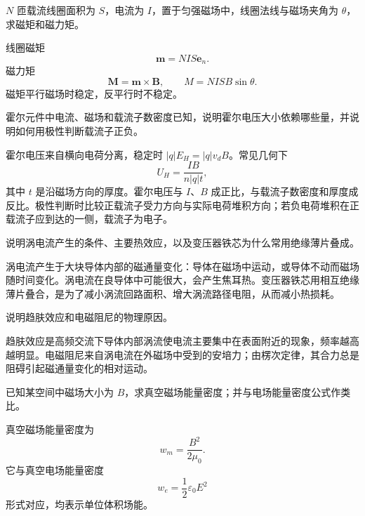 \begin{exercise}[level=standard]
$N$ 匝载流线圈面积为 $S$，电流为 $I$，置于匀强磁场中，线圈法线与磁场夹角为 $\theta$，求磁矩和磁力矩。
\begin{solution}
线圈磁矩
\[
  \bm m=NIS\bm e_n.
\]
磁力矩
\[
  \bm M=\bm m\times\bm B,\qquad M=NISB\sin\theta.
\]
磁矩平行磁场时稳定，反平行时不稳定。
\end{solution}
\end{exercise}

\begin{exercise}[level=standard]
霍尔元件中电流、磁场和载流子数密度已知，说明霍尔电压大小依赖哪些量，并说明如何用极性判断载流子正负。
\begin{solution}
霍尔电压来自横向电荷分离，稳定时 $|q|E_H=|q|v_dB$。常见几何下
\[
  U_H=\frac{IB}{n|q|t},
\]
其中 $t$ 是沿磁场方向的厚度。霍尔电压与 $I$、$B$ 成正比，与载流子数密度和厚度成反比。极性判断时比较正载流子受力方向与实际电荷堆积方向；若负电荷堆积在正载流子应到达的一侧，载流子为电子。
\end{solution}
\end{exercise}

\begin{exercise}[level=basic]
说明涡电流产生的条件、主要热效应，以及变压器铁芯为什么常用绝缘薄片叠成。
\begin{solution}
涡电流产生于大块导体内部的磁通量变化：导体在磁场中运动，或导体不动而磁场随时间变化。涡电流在良导体中可能很大，会产生焦耳热。变压器铁芯用相互绝缘薄片叠合，是为了减小涡流回路面积、增大涡流路径电阻，从而减小热损耗。
\end{solution}
\end{exercise}

\begin{exercise}[level=basic]
说明趋肤效应和电磁阻尼的物理原因。
\begin{solution}
趋肤效应是高频交流下导体内部涡流使电流主要集中在表面附近的现象，频率越高越明显。电磁阻尼来自涡电流在外磁场中受到的安培力；由楞次定律，其合力总是阻碍引起磁通量变化的相对运动。
\end{solution}
\end{exercise}

\begin{exercise}[level=advanced]
已知某空间中磁场大小为 $B$，求真空磁场能量密度；并与电场能量密度公式作类比。
\begin{solution}
真空磁场能量密度为
\[
  w_m=\frac{B^2}{2\mu_0}.
\]
它与真空电场能量密度
\[
  w_e=\frac12\varepsilon_0E^2
\]
形式对应，均表示单位体积场能。
\end{solution}
\end{exercise}


